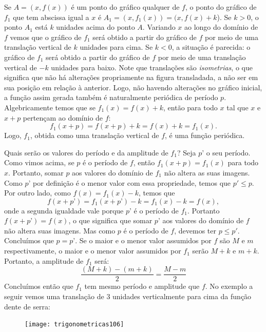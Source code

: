 Se $A = (x,f(x))$ é um ponto do gráfico qualquer de $f$, o ponto do gráfico de $f_1$ que tem abscissa igual a $x$ é $A_1 = (x, f_1(x)) = (x, f(x) + k$). Se $k > 0$, o ponto $A_1$ está $k$ unidades acima do ponto $A$. Variando $x$ ao longo do domínio de $f$ vemos que o gráfico de $f_1$ será obtido a partir do gráfico de $f$ por meio de uma translação vertical de $k$ unidades para cima. Se $k < 0$, a situação é parecida: o gráfico de $f_1$ será obtido a partir do gráfico de $f$ por meio de uma translação vertical de $-k$ unidades para baixo. Note que translações são \textit{isometrias}, o que significa que não há alterações propriamente na figura transladada, a não ser em sua posição em relação à anterior. Logo, não havendo alterações no gráfico inicial, a função assim gerada também é naturalmente periódica de período $p$. Algebricamente temos que se $f_1(x)=f(x)+k$, então para todo $x$ tal que $x$ e $x+p$ pertençam ao domínio de $f$:
\begin{equation*}
f_1(x+p) = f(x+p)+k = f(x)+k=f_1(x).
\end{equation*}
Logo, $f_1$, obtida como uma translação vertical de $f$, é uma função periódica.

Quais serão os valores do período e da amplitude de $f_1$? Seja $p’$ o seu período. Como vimos acima, se $p$ é o período de $f$, então $f_1(x+p) = f_1(x)$ para todo $x$. Portanto, somar $p$ aos valores do domínio de $f_1$ não altera as suas imagens. Como $p’$ por definição é o menor valor com essa propriedade, temos que $p'\leq p$. Por outro lado, como $f(x) = f_1(x) - k$, temos que 
\begin{equation*}
f(x+p’) = f_1(x + p’) - k = f_1(x) - k = f(x),
\end{equation*}
onde a segunda igualdade vale porque $p’$ é o período de $f_1$. Portanto $f(x+p’) = f(x)$, o que significa que somar $p’$ aos valores do domínio de $f$ não altera suas imagens. Mas como $p$ é o período de $f$, devemos ter $p\leq p'$. Concluímos que $p = p’$.
Se o maior e o menor valor assumidos por $f$ são $M$ e $m$ respectivamente, o maior e o menor valor assumidos por $f_1$ serão $M + k$ e $m + k$. Portanto, a amplitude de $f_1$ será:
\begin{equation*}
\frac{(M+k)-(m+k)}{2}=\frac{M-m}{2}
\end{equation*}
Concluímos então que $f_1$ tem mesmo período e amplitude que $f$. No exemplo a seguir vemos uma translação de $3$ unidades verticalmente para cima da função dente de serra:

\begin{figure}[H]
\centering

\texttt{[image: trigonometricas106]}
\end{figure}

